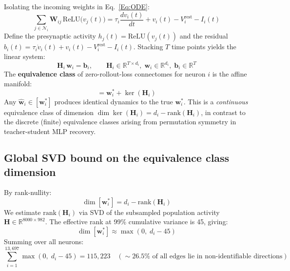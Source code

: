 \documentclass[11pt,a4paper]{article}
\begin{document}
Isolating the incoming weights in Eq.~\ref{Eq:ODE}:
\begin{equation}
\sum_{j\in\mathcal{N}_i} \mathbf{W}_{ij}\, \text{ReLU}\!\big(v_j(t)\big)
= \tau_i \frac{dv_i(t)}{dt} + v_i(t) - V_i^{\text{rest}} - I_i(t)
\label{Eq:ODE2}
\end{equation}
Define the presynaptic activity $h_j(t) = \text{ReLU}(v_j(t))$ and the residual
$b_i(t) = \tau_i \dot{v}_i(t) + v_i(t) - V_i^{\text{rest}} - I_i(t)$.
Stacking $T$ time points yields the linear system:
\begin{equation}
\mathbf{H}_i\, \mathbf{w}_i = \mathbf{b}_i, \qquad
\mathbf{H}_i \in \mathbb{R}^{T \times d_i},\;
\mathbf{w}_i \in \mathbb{R}^{d_i},\;
\mathbf{b}_i \in \mathbb{R}^T
\end{equation}
The \textbf{equivalence class} of zero-rollout-loss connectomes for neuron $i$ is
the affine manifold:
\begin{equation}
[\mathbf{w}_i^*] = \mathbf{w}_i^* + \ker(\mathbf{H}_i)
\end{equation}
Any $\hat{\mathbf{w}}_i \in [\mathbf{w}_i^*]$ produces identical dynamics to the
true $\mathbf{w}_i^*$. This is a \emph{continuous} equivalence class of dimension
$\dim\ker(\mathbf{H}_i) = d_i - \text{rank}(\mathbf{H}_i)$, in contrast to the
discrete (finite) equivalence classes arising from permutation symmetry in
teacher-student MLP recovery.

\subsection{Global SVD bound on the equivalence class dimension}
\label{subsec:global-svd}

By rank-nullity:
\begin{equation}
\dim[\mathbf{w}_i^*] = d_i - \text{rank}(\mathbf{H}_i)
\end{equation}
We estimate $\text{rank}(\mathbf{H}_i)$ via SVD of the subsampled population
activity $\mathbf{H} \in \mathbb{R}^{8000 \times 982}$. The effective rank at
99\% cumulative variance is 45, giving:
\begin{equation}
\dim[\mathbf{w}_i^*] \approx \max(0,\; d_i - 45)
\end{equation}
Summing over all neurons:
\begin{equation}\label{eq:null}
\sum_{i=1}^{13,697} \max(0,\; d_i - 45) = 115{,}223
\quad (\sim 26.5\% \text{ of all edges lie in non-identifiable directions})
\end{equation}
\end{document}
